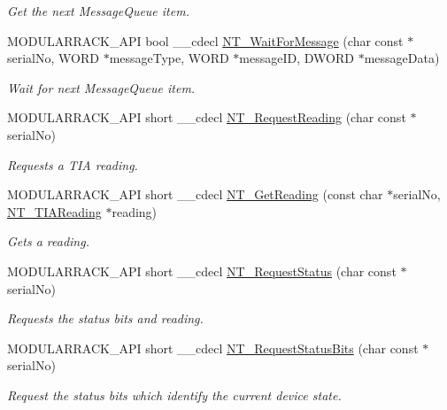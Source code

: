 \begin{DoxyCompactItemize}
\begin{DoxyCompactList}\small\item\em Get the next Message\+Queue item. \end{DoxyCompactList}\item 
M\+O\+D\+U\+L\+A\+R\+R\+A\+C\+K\+\_\+\+A\+PI bool \+\_\+\+\_\+cdecl \hyperlink{group___modular_nano_trak_gadd1925fc4d5b911d10e6c731a0530fd5}{N\+T\+\_\+\+Wait\+For\+Message} (char const $\ast$serial\+No, W\+O\+RD $\ast$message\+Type, W\+O\+RD $\ast$message\+ID, D\+W\+O\+RD $\ast$message\+Data)
\begin{DoxyCompactList}\small\item\em Wait for next Message\+Queue item. \end{DoxyCompactList}\item 
M\+O\+D\+U\+L\+A\+R\+R\+A\+C\+K\+\_\+\+A\+PI short \+\_\+\+\_\+cdecl \hyperlink{group___modular_nano_trak_ga595c1a46cd6f34080a96b3e79a3df639}{N\+T\+\_\+\+Request\+Reading} (char const $\ast$serial\+No)
\begin{DoxyCompactList}\small\item\em Requests a T\+IA reading. \end{DoxyCompactList}\item 
M\+O\+D\+U\+L\+A\+R\+R\+A\+C\+K\+\_\+\+A\+PI short \+\_\+\+\_\+cdecl \hyperlink{group___modular_nano_trak_ga8f3cf496e0116bad346b7b061d63f569}{N\+T\+\_\+\+Get\+Reading} (const char $\ast$serial\+No, \hyperlink{struct_n_t___t_i_a_reading}{N\+T\+\_\+\+T\+I\+A\+Reading} $\ast$reading)
\begin{DoxyCompactList}\small\item\em Gets a reading. \end{DoxyCompactList}\item 
M\+O\+D\+U\+L\+A\+R\+R\+A\+C\+K\+\_\+\+A\+PI short \+\_\+\+\_\+cdecl \hyperlink{group___modular_nano_trak_ga26336b4a68b0b2bd62cbdc2a7bb60a11}{N\+T\+\_\+\+Request\+Status} (char const $\ast$serial\+No)
\begin{DoxyCompactList}\small\item\em Requests the status bits and reading. \end{DoxyCompactList}\item 
M\+O\+D\+U\+L\+A\+R\+R\+A\+C\+K\+\_\+\+A\+PI short \+\_\+\+\_\+cdecl \hyperlink{group___modular_nano_trak_gaec5ed838e690c1bca861032a9e50521d}{N\+T\+\_\+\+Request\+Status\+Bits} (char const $\ast$serial\+No)
\begin{DoxyCompactList}\small\item\em Request the status bits which identify the current device state. \end{DoxyCompactList}\item 

\end{DoxyCompactItemize}
